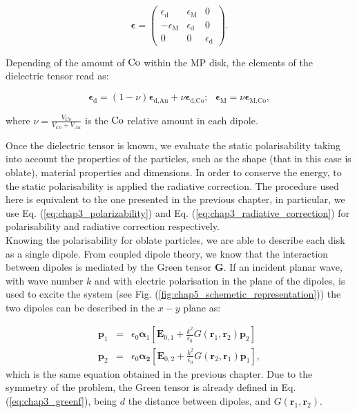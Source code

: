 \noindent 
\begin{equation}
\boldsymbol{\epsilon}=\begin{pmatrix}\epsilon_{\text{d}} & \epsilon_{\text{M}} & 0\\
-\epsilon_{\text{M}} & \epsilon_{\text{d}} & 0\\
0 & 0 & \epsilon_{\text{d}}
\end{pmatrix}.\label{Tensor}
\end{equation}


Depending of the amount of $\textnormal{Co}$ within the MP disk, the elements of the dielectric tensor read as: 

\noindent 
\begin{equation}
\boldsymbol{\epsilon}_{\text{{d}}}=\left(1-\nu\right)\boldsymbol{\epsilon}_{\text{d,Au}}+\nu\boldsymbol{\epsilon}_{\text{d,Co}};\:\:\:\boldsymbol{\epsilon}_{\text{{M}}}=\nu\boldsymbol{\epsilon}_{\text{M,Co}}\label{Concent},
\end{equation}
 

where $\nu=\frac{V_{Co}}{V_{Co}+V{}_{Au}}$ is the $\textnormal{Co}$ relative amount in each dipole.

Once the dielectric tensor is known, we evaluate the static polarisability taking into account the properties of the particles, such as the shape (that in this case is oblate), material properties and dimensions. In order to conserve the energy, to the static polarisability is applied the radiative correction. The procedure used here is equivalent to the one presented in the previous chapter, in particular, we use Eq. (\ref{eq:chap3_polarizability}) and Eq. (\ref{eq:chap3_radiative_correction}) for polarisability and radiative correction respectively. \\

Knowing the polarisability for oblate particles, we are able to describe each disk as a single dipole. From coupled dipole theory, we know that the interaction between dipoles is mediated by the Green tensor $\mathbf{G}$. If an incident planar wave, with wave number $k$ and with electric polarisation in the plane of the dipoles, is used to excite the system (see Fig. (\ref{fig:chap5_schemetic_representation})) the two dipoles can be described in the $x-y$ plane as: 

\begin{eqnarray}
\mathbf{p}_{1} & = & \epsilon_{0} \boldsymbol{\alpha}_{1}\left[\mathbf{E}_{0,1}+\frac{k^2}{\epsilon_{0}}{G}\left(\mathbf{r}_{1},\mathbf{r}_{2}\right)\mathbf{p}_{2}\right]\nonumber \\
\mathbf{p}_{2} & = & \epsilon_{0} \boldsymbol{\alpha_{2}}\left[\mathbf{E}_{0,2}+\frac{k^2}{\epsilon_{0}}{G}\left(\mathbf{r}_{2},\mathbf{r}_{1}\right)\mathbf{p}_{1}\right],\label{Twodip}
\end{eqnarray}
which is the same equation obtained in the previous chapter. Due to the symmetry of the problem, the Green tensor is already defined in Eq. (\ref{eq:chap3_greenf}),  being $d$ the distance between dipoles, and $G\left(\mathbf{r}_{1},\mathbf{r}_{2}\right)$.\\


